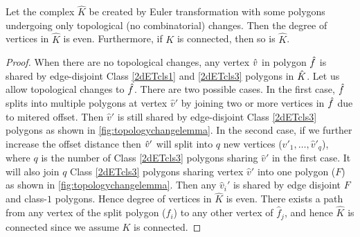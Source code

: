 \begin{lem}
  Let the complex $\hat{K}$ be created by Euler transformation with some polygons undergoing only topological (no combinatorial) changes.
  Then the degree of vertices in $\hat{K}$ is even.
  Furthermore, if $K$ is connected, then so is $\hat{K}$. 
\end{lem}
\begin{proof}
  When there are no topological changes, any vertex $\hat{v}$ in polygon $\hat{f}$ is shared by edge-disjoint Class \ref{2dETcls1} and \ref{2dETcls3} polygons in $\hat{K}$. 
  Let us allow topological changes to $\hat{f}$.
  There are two possible cases.
  In the first case, $\hat{f}$ splits into multiple polygons at vertex $\hat{v}'$ by joining two or more vertices in $\hat{f}$ due to mitered offset.
  Then $\hat{v}'$ is still shared by edge-disjoint Class \ref{2dETcls3} polygons as shown in \cref{fig:topologychangelemma}.
  In the second case, if we further increase the offset distance then $\hat{v}'$ will split into $q$ new vertices ($\hat{v}'_1, \dots, \hat{v}'_q$), where $q$ is the number of Class \ref{2dETcls3} polygons sharing $\hat{v}'$ in the first case.
  It will also join $q$ Class \ref{2dETcls3} polygons sharing vertex $\hat{v}'$ into one polygon ($F$) as shown in \cref{fig:topologychangelemma}.
  Then any $\hat{v}_i'$ is shared by edge disjoint $F$ and class-$1$ polygons.
  Hence degree of vertices in $\hat{K}$ is even. 	   
  There exists a path from any vertex of the split polygon ($\hat{f}_i$) to any other vertex of $\hat{f}_j$, and hence $\hat{K}$ is connected since we assume $K$ is connected.
\end{proof}
